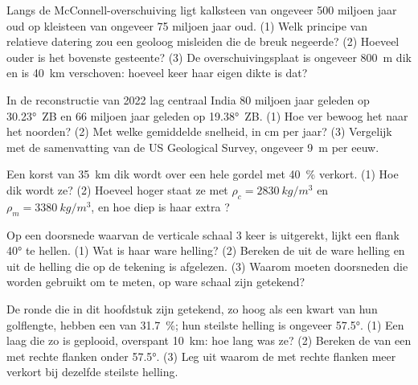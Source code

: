 \begin{exercise}[$\star\star$]\label{exo:g12:mountain-building:8}
Langs de McConnell-overschuiving ligt kalksteen van ongeveer 500 miljoen jaar oud op
kleisteen van ongeveer 75 miljoen jaar oud. (1) Welk principe van relatieve datering
zou een geoloog misleiden die de breuk negeerde? (2) Hoeveel ouder is het
bovenste gesteente? (3) De overschuivingsplaat is ongeveer \qty{800}{m} dik en is
\qty{40}{km} verschoven: hoeveel keer haar eigen dikte is dat?
\end{exercise}

\begin{exercise}[$\star\star$]\label{exo:g12:mountain-building:9}
In de reconstructie van 2022 lag centraal India 80 miljoen jaar geleden op \ang{30.23}~ZB
en 66 miljoen jaar geleden op \ang{19.38}~ZB. (1) Hoe ver bewoog het
naar het noorden? (2) Met welke gemiddelde snelheid, in \unit{cm} per jaar? (3) Vergelijk met de
samenvatting van de US Geological Survey, ongeveer \qty{9}{m} per eeuw.
\end{exercise}

\begin{exercise}[$\star\star$]\label{exo:g12:mountain-building:10}
Een korst van \qty{35}{km} dik wordt over een hele gordel met \qty{40}{\percent}
verkort. (1) Hoe dik wordt ze? (2) Hoeveel hoger staat ze met $\rho_c =
\qty{2830}{kg/m^3}$ en $\rho_m = \qty{3380}{kg/m^3}$,
en hoe diep is haar extra ?
\end{exercise}

\begin{exercise}[$\star\star$]\label{exo:g12:mountain-building:11}
Op een doorsnede waarvan de verticale schaal 3 keer is uitgerekt, lijkt een flank
\ang{40} te hellen. (1) Wat is haar ware helling? (2) Bereken de  uit de
ware helling en uit de helling die op de tekening is afgelezen. (3) Waarom moeten doorsneden die worden gebruikt om
 te meten, op ware schaal zijn getekend?
\end{exercise}

\begin{exercise}[$\star\star\star$]\label{exo:g12:mountain-building:12}
De ronde  die in dit hoofdstuk zijn getekend, zo hoog als een kwart van hun
golflengte, hebben een  van \qty{31.7}{\percent}; hun steilste helling is
ongeveer \ang{57.5}. (1) Een laag die zo is geplooid, overspant \qty{10}{km}: hoe lang
was ze? (2) Bereken de  van een  met rechte flanken onder
\ang{57.5}. (3) Leg uit waarom de  met rechte flanken meer verkort bij
dezelfde steilste helling.
\end{exercise}

